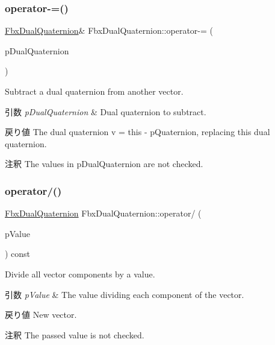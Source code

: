 \subsubsection{\texorpdfstring{operator-\/=()}{operator-=()}\hspace{0.1cm}{\footnotesize\ttfamily [2/2]}}
{\footnotesize\ttfamily \hyperlink{class_fbx_dual_quaternion}{Fbx\+Dual\+Quaternion}\& Fbx\+Dual\+Quaternion\+::operator-\/= (\begin{DoxyParamCaption}\item[{const \hyperlink{class_fbx_dual_quaternion}{Fbx\+Dual\+Quaternion} \&}]{p\+Dual\+Quaternion }\end{DoxyParamCaption})}

Subtract a dual quaternion from another vector. 
\begin{DoxyParams}{引数}
{\em p\+Dual\+Quaternion} & Dual quaternion to subtract. \\
\hline
\end{DoxyParams}
\begin{DoxyReturn}{戻り値}
The dual quaternion v\textquotesingle{} = this -\/ p\+Quaternion, replacing this dual quaternion. 
\end{DoxyReturn}
\begin{DoxyRemark}{注釈}
The values in p\+Dual\+Quaternion are not checked. 
\end{DoxyRemark}
\mbox{\label{class_fbx_dual_quaternion_a4b1a647cdefe5a4005525230545be830}} 
\subsubsection{\texorpdfstring{operator/()}{operator/()}\hspace{0.1cm}{\footnotesize\ttfamily [1/2]}}
{\footnotesize\ttfamily \hyperlink{class_fbx_dual_quaternion}{Fbx\+Dual\+Quaternion} Fbx\+Dual\+Quaternion\+::operator/ (\begin{DoxyParamCaption}\item[{double}]{p\+Value }\end{DoxyParamCaption}) const}

Divide all vector components by a value. 
\begin{DoxyParams}{引数}
{\em p\+Value} & The value dividing each component of the vector. \\
\hline
\end{DoxyParams}
\begin{DoxyReturn}{戻り値}
New vector. 
\end{DoxyReturn}
\begin{DoxyRemark}{注釈}
The passed value is not checked. 
\end{DoxyRemark}
\mbox{\label{class_fbx_dual_quaternion_a76538b4d54469e113b1a57881b0cc26a}} 
